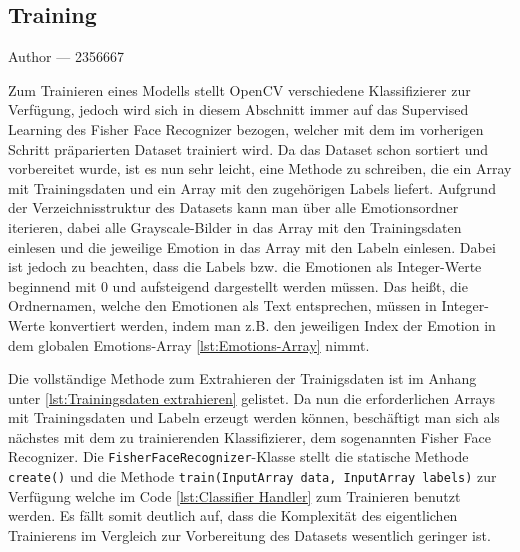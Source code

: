 \documentclass[12pt, a4paper]{report}
\makeatletter
\newcommand{\sectionauthor}[1]{%
  {\parindent0pt\vspace*{-5pt}%
  \large{Author --- }
  \linespread{1.1}\large\scshape#1%
  \par\nobreak\vspace*{35pt} }
  \@afterheading%
}
\makeatother
\begin{document}
\subsection{Training}
\sectionauthor{2356667}
Zum Trainieren eines Modells stellt OpenCV verschiedene Klassifizierer zur Verfügung, jedoch wird sich in diesem Abschnitt immer auf das Supervised Learning des Fisher Face Recognizer bezogen, welcher mit dem im vorherigen Schritt präparierten Dataset trainiert wird. Da das Dataset schon sortiert und vorbereitet wurde, ist es nun sehr leicht, eine Methode zu schreiben, die ein Array mit Trainingsdaten und ein Array mit den zugehörigen Labels liefert. Aufgrund der Verzeichnisstruktur des Datasets kann man über alle Emotionsordner iterieren, dabei alle Grayscale-Bilder in das Array mit den Trainingsdaten einlesen und die jeweilige Emotion in das Array mit den Labeln einlesen. Dabei ist jedoch zu beachten, dass die Labels bzw. die Emotionen als Integer-Werte beginnend mit 0 und aufsteigend dargestellt werden müssen. Das heißt, die Ordnernamen, welche den Emotionen als Text entsprechen, müssen in Integer-Werte konvertiert werden, indem man z.B. den jeweiligen Index der Emotion in dem globalen Emotions-Array \ref{lst:Emotions-Array} nimmt.

Die vollständige Methode zum Extrahieren der Trainigsdaten ist im Anhang unter \ref{lst:Trainingsdaten extrahieren} gelistet. 
Da nun die erforderlichen Arrays mit Trainingsdaten und Labeln erzeugt werden können, beschäftigt man sich als nächstes mit dem zu trainierenden Klassifizierer, dem sogenannten Fisher Face Recognizer. Die \texttt{FisherFaceRecognizer}-Klasse stellt die statische Methode \texttt{create()} und die Methode \texttt{train(InputArray data, InputArray labels)} zur Verfügung welche im Code \ref{lst:Classifier Handler} zum Trainieren benutzt werden. Es fällt somit deutlich auf, dass die Komplexität des eigentlichen Trainierens im Vergleich zur Vorbereitung des Datasets wesentlich geringer ist.
\end{document}
